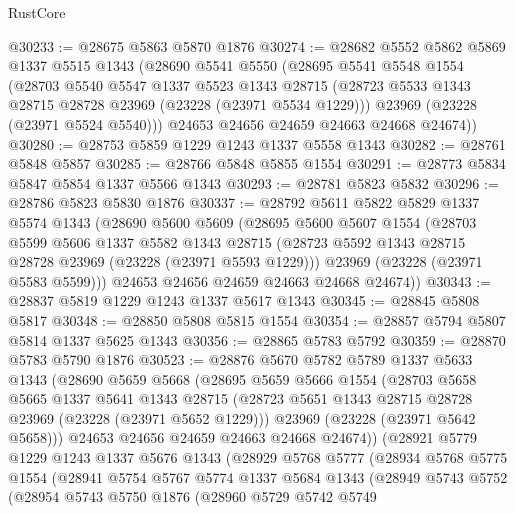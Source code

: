 \begin{lexlean}{RustCore}
\begin{coremodule}
@30233 := @28675 @5863 @5870 @1876
@30274 := @28682
    @5552
    @5862
    @5869
    @1337
    @5515
    @1343
    (@28690
      @5541
      @5550
      (@28695
        @5541
        @5548
        @1554
        (@28703
          @5540
          @5547
          @1337
          @5523
          @1343
          @28715
          (@28723 @5533 @1343 @28715 @28728 @23969 (@23228 (@23971 @5534 @1229)))
          @23969
          (@23228 (@23971 @5524 @5540)))
        @24653
        @24656
        @24659
        @24663
        @24668
        @24674))
@30280 := @28753 @5859 @1229 @1243 @1337 @5558 @1343
@30282 := @28761 @5848 @5857
@30285 := @28766 @5848 @5855 @1554
@30291 := @28773 @5834 @5847 @5854 @1337 @5566 @1343
@30293 := @28781 @5823 @5832
@30296 := @28786 @5823 @5830 @1876
@30337 := @28792
    @5611
    @5822
    @5829
    @1337
    @5574
    @1343
    (@28690
      @5600
      @5609
      (@28695
        @5600
        @5607
        @1554
        (@28703
          @5599
          @5606
          @1337
          @5582
          @1343
          @28715
          (@28723 @5592 @1343 @28715 @28728 @23969 (@23228 (@23971 @5593 @1229)))
          @23969
          (@23228 (@23971 @5583 @5599)))
        @24653
        @24656
        @24659
        @24663
        @24668
        @24674))
@30343 := @28837 @5819 @1229 @1243 @1337 @5617 @1343
@30345 := @28845 @5808 @5817
@30348 := @28850 @5808 @5815 @1554
@30354 := @28857 @5794 @5807 @5814 @1337 @5625 @1343
@30356 := @28865 @5783 @5792
@30359 := @28870 @5783 @5790 @1876
@30523 := @28876
    @5670
    @5782
    @5789
    @1337
    @5633
    @1343
    (@28690
      @5659
      @5668
      (@28695
        @5659
        @5666
        @1554
        (@28703
          @5658
          @5665
          @1337
          @5641
          @1343
          @28715
          (@28723 @5651 @1343 @28715 @28728 @23969 (@23228 (@23971 @5652 @1229)))
          @23969
          (@23228 (@23971 @5642 @5658)))
        @24653
        @24656
        @24659
        @24663
        @24668
        @24674))
    (@28921
      @5779
      @1229
      @1243
      @1337
      @5676
      @1343
      (@28929
        @5768
        @5777
        (@28934
          @5768
          @5775
          @1554
          (@28941
            @5754
            @5767
            @5774
            @1337
            @5684
            @1343
            (@28949
              @5743
              @5752
              (@28954
                @5743
                @5750
                @1876
                (@28960
                  @5729
                  @5742
                  @5749

\end{coremodule}
\end{lexlean}
